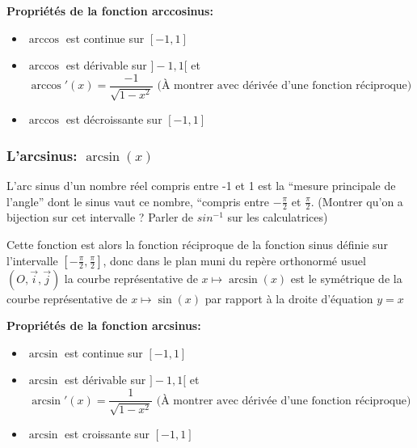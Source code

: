 \textbf{Propriétés de la fonction arccosinus: }
\begin{itemize}[label=$\bullet$, leftmargin=2cm]
\item $\arccos$ est continue sur  $[-1,1]$
\item $\arccos$ est dérivable sur $]-1,1[$ et
  \[
    \arccos'(x)=\frac{-1}{\sqrt{1-x^2}} \text{ (À montrer avec dérivée
      d'une fonction réciproque)}
  \]
\item $\arccos$ est décroissante sur $[-1,1]$
\end{itemize}

\subsubsection{L'arcsinus: $\arcsin(x)$}

L'arc sinus d'un nombre réel compris entre -1 et 1 est la ``mesure principale
de l'angle'' dont le sinus vaut ce nombre, ``compris entre  $-\frac{\pi}{2}$ et
$\frac{\pi}{2}$. (Montrer qu'on a bijection sur cet intervalle ? Parler de $sin^{-1}$ sur
les calculatrices)

Cette fonction est alors la fonction réciproque de la fonction sinus définie
sur l'intervalle $[-\frac{\pi}{2},\frac{\pi}{2}]$, donc dans le plan muni du repère orthonormé usuel
$(O,\vec{i}, \vec{j})$ la courbe représentative de $x \mapsto \arcsin(x)$ est le
symétrique de la courbe représentative de $x \mapsto \sin(x)$ par rapport à
la droite d'équation $y=x$

\begin{center}
\end{center}

\textbf{Propriétés de la fonction arcsinus: }
\begin{itemize}[label=$\bullet$, leftmargin=2cm]
\item $\arcsin$ est continue sur  $[-1,1]$
\item $\arcsin$ est dérivable sur $]-1,1[$ et
  \[
    \arcsin'(x)=\frac{1}{\sqrt{1-x^2}} \text{ (À montrer avec dérivée
      d'une fonction réciproque)}
  \]
\item $\arcsin$ est croissante sur $[-1,1]$
\end{itemize}

